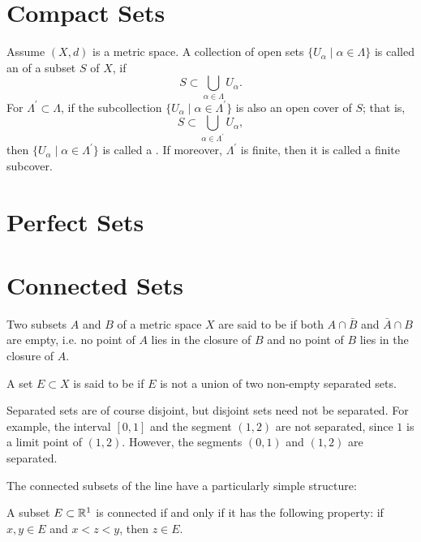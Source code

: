 \section{Compact Sets}
\begin{definition}
Assume $(X,d)$ is a metric space. A collection of open sets $\{U_\alpha\mid\alpha\in\Lambda\}$ is called an  of a subset $S$ of $X$, if
\[ S\subset\bigcup_{\alpha\in\Lambda}U_\alpha. \]
For $\Lambda^\prime\subset\Lambda$, if the subcollection $\{U_\alpha\mid\alpha\in\Lambda^\prime\}$ is also an open cover of $S$; that is,
\[ S\subset\bigcup_{\alpha\in\Lambda^\prime}U_\alpha, \]
then $\{U_\alpha\mid\alpha\in\Lambda^\prime\}$ is called a . If moreover, $\Lambda^\prime$ is finite, then it is called a finite subcover.
\end{definition}



\section{Perfect Sets}


\section{Connected Sets}
\begin{definition}
Two subsets $A$ and $B$ of a metric space $X$ are said to be  if both $A\cap\bar{B}$ and $\bar{A}\cap B$ are empty, i.e. no point of $A$ lies in the closure of $B$ and no point of $B$ lies in the closure of $A$.

A set $E\subset X$ is said to be  if $E$ is not a union of two non-empty separated sets. 
\end{definition}

\begin{remark}
Separated sets are of course disjoint, but disjoint sets need not be separated. For example, the interval $[0,1]$ and the segment $(1,2)$ are not separated, since $1$ is a limit point of $(1,2)$. However, the segments $(0,1)$ and $(1,2)$ are separated.
\end{remark}

The connected subsets of the line have a particularly simple structure: 

\begin{proposition}
A subset $E\subset\mathbb R^1$ is connected if and only if it has the following property: if $x,y\in E$ and $x<z<y$, then $z\in E$.
\end{proposition}

